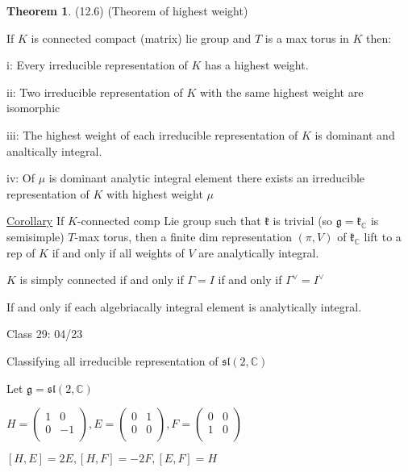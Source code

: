 \documentclass{article}
\theoremstyle{definition}
\newtheorem{theorem}{Theorem}
\begin{document}
\begin{theorem}
    (12.6) (Theorem of highest weight)

    If \(K\) is connected compact (matrix) lie group and \(T\) is a max torus in \(K\) then:
    
    i: Every irreducible representation of \(K\) has a highest weight.

    ii: Two irreducible representation of \(K\) with the same highest weight are isomorphic

    iii: The highest weight of each irreducible representation of \(K\) is dominant and analtically integral.

    iv: Of \(\mu\) is dominant analytic integral element there exists an irreducible representation of \(K\) with highest weight \(\mu\) 
\end{theorem}

\underline{Corollary} If \(K\)-connected comp Lie group such that \(\mathfrak{k}\) is trivial (so \(\mathfrak{g} = \mathfrak{k}_\mathbb{C}\) is semisimple) \(T\)-max torus, then a finite dim representation \((\pi,V)\) of \(\mathfrak{k}_\mathbb{C}\) lift to a rep of \(K\) if and only if all weights of \(V\) are analytically integral.

\(K\) is simply connected if and only if \(\Gamma = I\) if and only if \(\Gamma ^\vee = I ^ \vee\)

If and only if each algebriacally integral element is analytically integral.

\hrulefill

Class 29: 04/23

Classifying all irreducible representation of \(\mathfrak{sl}(2,\mathbb{C})\) 

Let \(\mathfrak{g} = \mathfrak{sl} (2,\mathbb{C})\) 

\(H = \begin{pmatrix}
    1 &  0 \\
    0 &  -1 \\
\end{pmatrix}, E = \begin{pmatrix}
    0 &  1 \\
    0 &  0 \\
\end{pmatrix}, F = \begin{pmatrix}
    0 &  0 \\
    1 &  0 \\
\end{pmatrix}\)

\([H,E]=2E, [H,F]=-2F, [E,F]=H\) 
\end{document}

